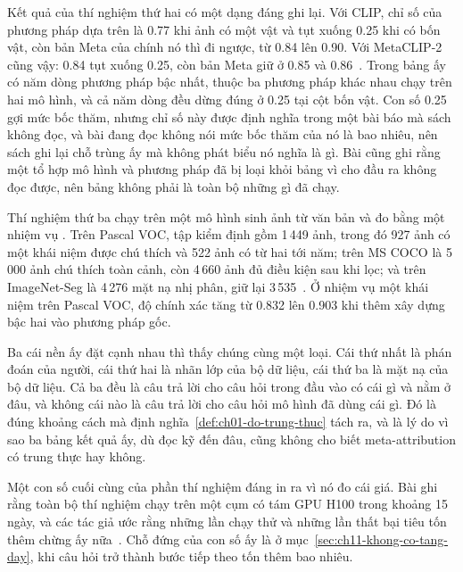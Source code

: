 Kết quả của thí nghiệm thứ hai có một dạng đáng ghi lại. Với CLIP, chỉ số của
phương pháp dựa trên  là 0.77 khi ảnh có một vật và tụt xuống 0.25
khi có bốn vật, còn bản Meta của chính nó thì đi ngược, từ 0.84 lên 0.90. Với
MetaCLIP-2 cũng vậy: 0.84 tụt xuống 0.25, còn bản Meta giữ ở 0.85 và
0.86~\autocite{p23metagame}. Trong bảng ấy có năm dòng phương pháp bậc nhất,
thuộc ba phương pháp khác nhau chạy trên hai mô hình, và cả năm dòng đều dừng
đúng ở 0.25 tại cột bốn vật. Con số 0.25 gợi mức bốc
thăm, nhưng chỉ số này được định nghĩa trong một bài báo mà sách không đọc, và
bài đang đọc không nói mức bốc thăm của nó là bao nhiêu, nên sách ghi lại chỗ
trùng ấy mà không phát biểu nó nghĩa là gì. Bài cũng ghi rằng một tổ hợp mô
hình và phương pháp đã bị loại khỏi bảng vì cho đầu ra không đọc được, nên bảng
không phải là toàn bộ những gì đã chạy.

Thí nghiệm thứ ba chạy trên một mô hình sinh ảnh từ văn bản và đo bằng một
nhiệm vụ . Trên Pascal VOC, tập kiểm định gồm 1\,449 ảnh, trong đó 927
ảnh có một khái niệm được chú thích và 522 ảnh có từ hai tới năm; trên MS COCO
là 5\,000 ảnh chú thích toàn cảnh, còn 4\,660 ảnh đủ điều kiện sau khi lọc; và
trên ImageNet-Seg là 4\,276 mặt nạ nhị phân, giữ lại 3\,535~\autocite{p23metagame}.
Ở nhiệm vụ một khái niệm trên Pascal VOC, độ chính xác tăng từ 0.832 lên 0.903
khi thêm xây dựng bậc hai vào phương pháp gốc.

Ba cái nền ấy đặt cạnh nhau thì thấy chúng cùng một loại. Cái thứ nhất là phán
đoán của người, cái thứ hai là nhãn lớp của bộ dữ liệu, cái thứ ba là mặt nạ
của bộ dữ liệu. Cả ba đều là câu trả lời cho câu hỏi trong đầu vào có cái gì và
nằm ở đâu, và không cái nào là câu trả lời cho câu hỏi mô hình đã dùng cái gì.
Đó là đúng khoảng cách mà định nghĩa~\ref{def:ch01-do-trung-thuc} tách ra, và
là lý do vì sao ba bảng kết quả ấy, dù đọc kỹ đến đâu, cũng không cho biết
meta-attribution có trung thực hay không.

Một con số cuối cùng của phần thí nghiệm đáng in ra vì nó đo cái giá. Bài ghi
rằng toàn bộ thí nghiệm chạy trên một cụm có tám GPU H100 trong khoảng 15 ngày,
và các tác giả ước rằng những lần chạy thử và những lần thất bại tiêu tốn thêm
chừng ấy nữa~\autocite{p23metagame}. Chỗ đứng của con số ấy là ở
mục~\ref{sec:ch11-khong-co-tang-day}, khi câu hỏi trở thành bước tiếp theo tốn
thêm bao nhiêu.
%
